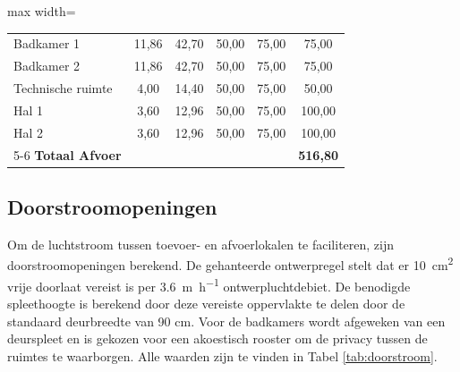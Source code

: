 \documentclass[a4paper,12pt]{article}
\begin{document}
\begin{table}[!ht]
\begin{adjustbox}{max width=\textwidth}
\begin{tabular}{lccccc}
        Badkamer 1 & 11,86 & 42,70 & 50,00 & 75,00 & 75,00 \\
        Badkamer 2 & 11,86 & 42,70 & 50,00 & 75,00 & 75,00 \\
        Technische ruimte & 4,00 & 14,40 & 50,00 & 75,00 & 50,00 \\
        Hal 1 & 3,60 & 12,96 & 50,00 & 75,00 & 100,00 \\
        Hal 2 & 3,60 & 12,96 & 50,00 & 75,00 & 100,00 \\
        \cmidrule{5-6}
        \rowcolor{gray!20}
        \textbf{Totaal Afvoer} & ~ & ~ & ~ & ~ & \textbf{516,80} \\
        \bottomrule
    \end{tabular}
    \end{adjustbox}
\end{table}




\subsection{Doorstroomopeningen}
Om de luchtstroom tussen toevoer- en afvoerlokalen te faciliteren, zijn doorstroomopeningen berekend. De gehanteerde ontwerpregel stelt dat er \qty{10}{\square\centi\meter} vrije doorlaat vereist is per \qty{3,6}{\meter\per\hour} ontwerpluchtdebiet. De benodigde spleethoogte is berekend door deze vereiste oppervlakte te delen door de standaard deurbreedte van 90 cm. Voor de badkamers wordt afgeweken van een deurspleet en is gekozen voor een akoestisch rooster om de privacy tussen de ruimtes te waarborgen. Alle waarden zijn te vinden in Tabel \ref{tab:doorstroom}.
\end{document}
